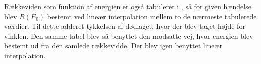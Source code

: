 Rækkeviden som funktion af energien er også tabuleret i \cite{Ziegler}, så for given hændelse blev
$R(E_{0})$ bestemt ved lineær interpolation mellem to de nærmeste tabulerede værdier. Til dette
adderet tykkelsen af dødlaget, hvor der blev taget højde for vinklen. Den samme tabel blev så
benyttet den modsatte vej, hvor energien blev bestemt ud fra den samlede rækkevidde. Der blev igen
benyttet lineær interpolation. 












